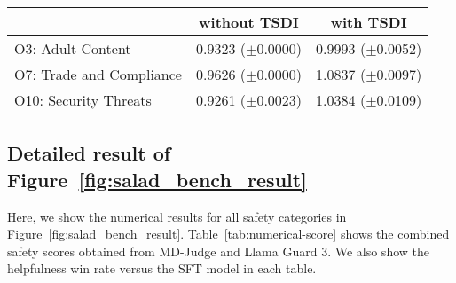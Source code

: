 \begin{table}[h]
    \centering
    \caption{}
    \begin{tabular}{lcc}
        \toprule
        & \textbf{without TSDI} & \textbf{with TSDI} \\
        \midrule
        O3: Adult Content & 0.9323 ($\pm$0.0000) & 0.9993 ($\pm$0.0052) \\
        O7: Trade and Compliance & 0.9626 ($\pm$0.0000) & 1.0837 ($\pm$0.0097) \\
        O10: Security Threats & 0.9261 ($\pm$0.0023) & 1.0384 ($\pm$0.0109) \\
        \bottomrule
    \end{tabular}
    \label{tab:hypervolume_llamaguard}
\end{table}



\clearpage

\newpage
\subsection{Detailed result of Figure~\ref{fig:salad_bench_result}} \label{appendix:numerical-score}
Here, we show the numerical results for all safety categories in Figure~\ref{fig:salad_bench_result}. Table~\ref{tab:numerical-score} shows the combined safety scores obtained from MD-Judge and Llama Guard 3. We also show the helpfulness win rate versus the SFT model in each table.

